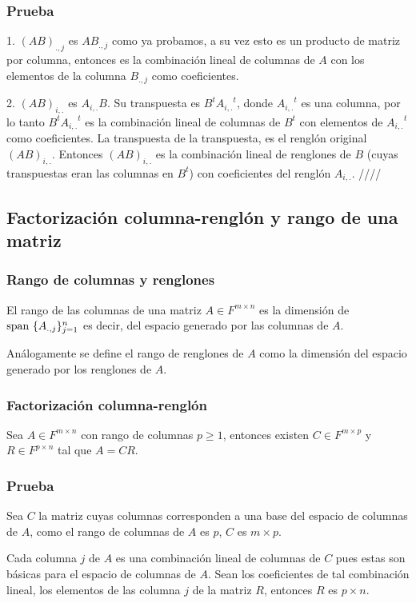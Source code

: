 \documentclass{article}
\begin{document}
\subsubsection*{Prueba}
1. $(AB)_{.,j}$ es $AB_{.,j}$ como ya probamos, a su vez esto
es un producto de matriz por columna, entonces es la combinación lineal
de columnas de $A$ con los elementos de la columna $B_{.,j}$ como
coeficientes.

2. $(AB)_{i,.}$ es $A_{i,.}B$. Su transpuesta es $B^t{A_{i,.}}^t$, donde
${A_{i,.}}^t$ es una columna, por lo tanto $B^t{A_{i,.}}^t$ es la combinación lineal de columnas de $B^t$ con
elementos de ${A_{i,.}}^t$ como coeficientes. La transpuesta de la
transpuesta, es el renglón original $(AB)_{i,.}$. Entonces
$(AB)_{i,.}$ es la combinación lineal de renglones de $B$ (cuyas transpuestas eran las columnas en $B^t$) con coeficientes del renglón $A_{i,.}$.
\hfill ////

\subsection{Factorización columna-renglón y rango de una matriz}
\subsubsection{Rango de columnas y renglones}
El rango de las columnas de una matriz $A\in F^{m\times n}$
es la dimensión de \\
$\text{span } \{A_{.,j}\}_{j=1}^n$ es decir, del
espacio generado por las columnas de $A$.

Análogamente se define el rango de renglones de $A$ como la 
dimensión del espacio generado por los renglones de $A$.

\subsubsection{Factorización columna-renglón}
Sea $A\in F^{m\times n}$ con rango de columnas $p\geq 1$,
entonces existen $C\in F^{m\times p}$ y $R\in F^{p\times n}$
tal que $A=CR$.
\subsubsection*{Prueba}
Sea $C$ la matriz cuyas columnas corresponden a una base del
espacio de columnas de $A$, como el rango de columnas de $A$ es $p$,
$C$ es $m\times p$.

Cada columna $j$ de $A$ es una combinación lineal
de columnas de $C$ pues estas son básicas para el espacio de columnas
de $A$. Sean los coeficientes de tal combinación lineal, los elementos
de las columna $j$ de la matriz $R$, entonces $R$ es $p\times n$.
\end{document}
